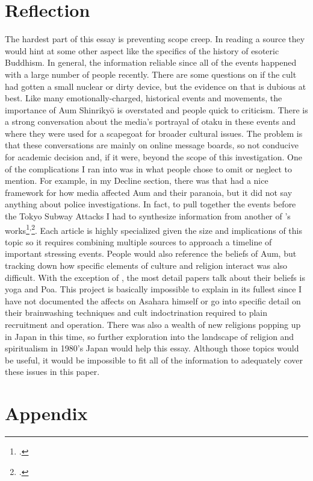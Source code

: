 \documentclass[12pt, letterpaper]{article}
\newcommand{\poses}[1]{#1's}
\begin{document}
\section{Reflection}
The hardest part of this essay is preventing scope creep. In reading a source they would hint at some other
aspect like the specifics of the history of esoteric Buddhism. In general, the information reliable since all
of the events happened with a large number of people recently. There are some questions on if the cult had
gotten a small nuclear or dirty device, but the evidence on that is dubious at best. Like many
emotionally-charged, historical events and movements, the importance of Aum Shinriky\=o is overstated and
people quick to criticism. There is a strong conversation about the media's portrayal of otaku in these 
events and where they were used for a scapegoat for broader cultural issues. The problem is that these
conversations are mainly on online message boards, so not conducive for academic decision and, if it were,
beyond the scope of this investigation. One of the complications I ran into was in what people chose to omit
or neglect to mention. For example, in my Decline section, there was  that
had a nice framework for how media affected Aum and their paranoia, but it did not say anything about police
investigations. In fact, to pull together the events before the Tokyo Subway Attacks I had to synthesize
information from another of \poses{\citeauthor{watanabe_reactions_1997}}
works\footcite{watanabe_reactions_1997}\textsuperscript{,}\footcite{watanabe_religion_1998}. Each article is
highly specialized given the size and implications of this topic so it requires combining multiple sources to
approach a timeline of important stressing events. People would also reference the beliefs of Aum, but
tracking down how specific elements of culture and religion interact was also difficult. With the exception
of , the most detail papers talk about their beliefs is yoga and Poa. This
project is basically impossible to explain in its fullest since I have not documented the affects on Asahara
himself or go into specific detail on their brainwashing techniques and cult indoctrination required to plain
recruitment and operation. There was also a wealth of new religions popping up in Japan in this time, so
further exploration into the landscape of religion and spiritualism in \poses{1980} Japan would help this
essay. Although those topics would be useful, it would be impossible to fit all of the information to
adequately cover these issues in this paper.

\newpage
\printbibliography{}
\newpage
\section*{Appendix}
\listoffigures{}
\end{document}
